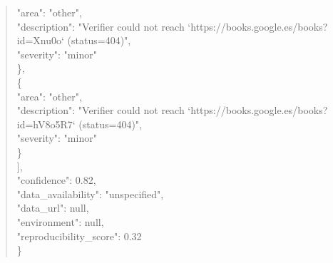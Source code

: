 \documentclass[11pt]{article}
\begin{document}
\begin{quote}
      "area": "other",\\
      "description": "Verifier could not reach `https://books.google.es/books?id=Xnu0o` (status=404)",\\
      "severity": "minor"\\
    \},\\
    \{\\
      "area": "other",\\
      "description": "Verifier could not reach `https://books.google.es/books?id=hV8o5R7` (status=404)",\\
      "severity": "minor"\\
    \}\\
  ],\\
  "confidence": 0.82,\\
  "data\_availability": "unspecified",\\
  "data\_url": null,\\
  "environment": null,\\
  "reproducibility\_score": 0.32\\
\}\\
\end{quote}
\end{document}
